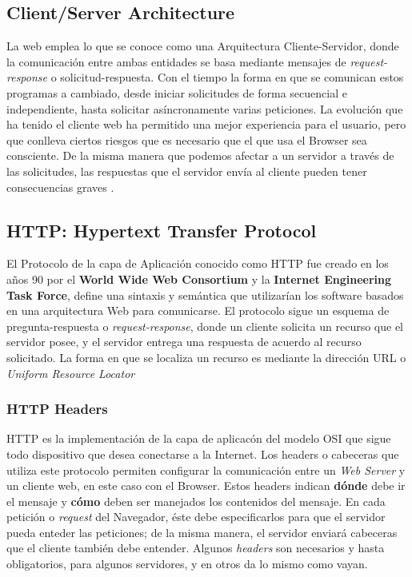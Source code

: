     \subsection{Client/Server Architecture}
    \label{chap2:ArqCS}
    La web emplea lo que se conoce como una Arquitectura Cliente-Servidor, donde la comunicación entre ambas entidades se basa mediante mensajes de \textit{request-response} o solicitud-respuesta. Con el tiempo la forma en que se comunican estos programas a cambiado, desde iniciar solicitudes de forma secuencial e independiente, hasta solicitar asíncronamente varias peticiones. La evolución que ha tenido el cliente web ha permitido una mejor experiencia para el usuario, pero que conlleva ciertos riesgos que es necesario que el que usa el Browser sea consciente. De la misma manera que podemos afectar a un servidor a través de las solicitudes, las respuestas que el servidor envía al cliente pueden tener consecuencias graves \cite{alcorn2014browser}.

    \subsection{HTTP: Hypertext Transfer Protocol}
    \label{chap2:HTTP}
    El Protocolo de la capa de Aplicación conocido como HTTP fue creado en los años 90 por el \textbf{World Wide Web Consortium} y la \textbf{Internet Engineering Task Force}, define una sintaxis y semántica que utilizarían los software basados en una arquitectura Web para comunicarse. El protocolo sigue un esquema de pregunta-respuesta o \textit{request-response}, donde un cliente solicita un recurso que el servidor posee, y el servidor entrega una respuesta de acuerdo al recurso solicitado. La forma en que se localiza un recurso es mediante la dirección URL o \textit{Uniform Resource Locator}

        \subsubsection{HTTP Headers}
        \label{chap2:headers}
        HTTP es la implementación de la capa de aplicacón del modelo OSI que sigue todo dispositivo que desea conectarse a la Internet. Los headers o cabeceras que utiliza este protocolo permiten configurar la comunicación entre un \textit{Web Server} y un cliente web, en este caso con el Browser. Estos headers indican \textbf{dónde} debe ir el mensaje y \textbf{cómo} deben ser manejados los contenidos del mensaje. En cada petición o \textit{request} del Navegador, éste debe especificarlos para que el servidor pueda enteder las peticiones; de la misma manera, el servidor enviará cabeceras que el cliente también debe entender. Algunos \textit{headers} son necesarios y hasta obligatorios, para algunos servidores, y en otros da lo mismo como vayan.

